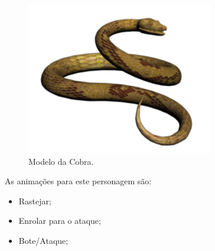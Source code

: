 \begin{itemize}
\begin{figure}[H]
 \centering
 \includegraphics[scale=0.7]{Imagens/cobra01.png}
 \caption{Modelo da Cobra.}
\label{img:cobra}
\end{figure}


As animações para este personagem são:
\begin{itemize}
\item Rastejar;
\item Enrolar para o ataque;
\item Bote/Ataque;
\end{itemize}
\end{itemize}


